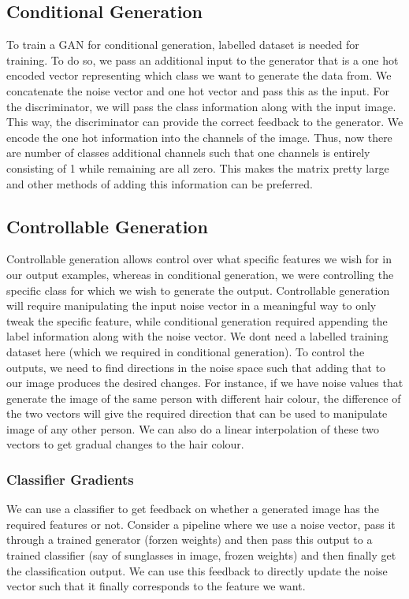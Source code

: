 \documentclass[../gan.tex]{subfiles}
\begin{document}
\subsection{Conditional Generation}
To train a GAN for conditional generation, labelled dataset is needed for training. To do so, we pass an additional input to the generator that is a one hot encoded vector representing which class we want to generate the data from. We concatenate the noise vector and one hot vector and pass this as the input.
For the discriminator, we will pass the class information along with the input image. This way, the discriminator can provide the correct feedback to the generator. We encode the one hot information into the channels of the image. Thus, now there are number of classes additional channels such that one channels is entirely consisting of 1 while remaining are all zero. This makes the matrix pretty large and other methods of adding this information can be preferred.
\subsection{Controllable Generation}
Controllable generation allows control over what specific features we wish for in our output examples, whereas in conditional generation, we were controlling the specific class for which we wish to generate the output. Controllable generation will require manipulating the input noise vector in a meaningful way to only tweak the specific feature, while conditional generation required appending the label information along with the noise vector. We dont need a labelled training dataset here (which we required in conditional generation).
To control the outputs, we need to find directions in the noise space such that adding that to our image produces the desired changes. For instance, if we have noise values that generate the image of the same person with different hair colour, the difference of the two vectors will give the required direction that can be used to manipulate image of any other person. We can also do a linear interpolation of these two vectors to get gradual changes to the hair colour.

\subsubsection{Classifier Gradients}
We can use a classifier to get feedback on whether a generated image has the required features or not. Consider a pipeline where we use a noise vector, pass it through a trained generator (forzen weights) and then pass this output to a trained classifier (say of sunglasses in image, frozen weights) and then finally get the classification output. We can use this feedback to directly update the noise vector such that it finally corresponds to the feature we want.
\end{document}
